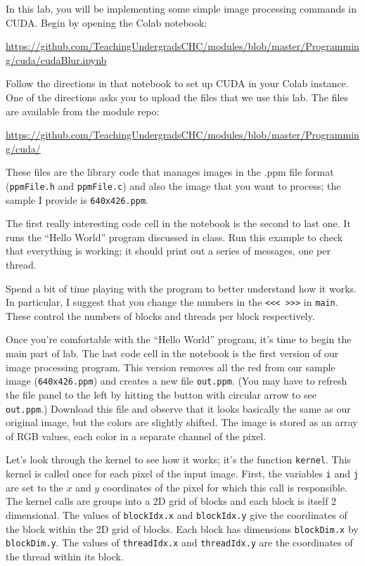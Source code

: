 \documentclass{article}
\begin{document}
In this lab, you will be implementing some simple image processing
commands in CUDA.
Begin by opening the Colab notebook:
\begin{center}
\small\url{https://github.com/TeachingUndergradsCHC/modules/blob/master/Programming/cuda/cudaBlur.ipynb}
\end{center}
Follow the directions in that notebook to set up CUDA in your Colab
instance. One of the directions asks you to upload the files that we
use this lab.
The files are available from the module repo:
\begin{center}
  \small\url{https://github.com/TeachingUndergradsCHC/modules/blob/master/Programming/cuda/}
\end{center}
These files are the library code that manages images in the .ppm
file format ({\tt ppmFile.h} and {\tt ppmFile.c}) and also the image
that you want to process; the sample I provide is {\tt 640x426.ppm}.

The first really interesting code cell in the notebook is the second
to last one.
It runs the ``Hello World'' program discussed in class.
Run this example to check that everything is working; it should print
out a series of messages, one per thread. 

Spend a bit of time playing with the program to better understand how
it works.
In particular, I suggest that you change the numbers in the
{\tt <<< >>>} in {\tt main}.
These control the numbers of blocks and threads per block respectively.

Once you’re comfortable with the ``Hello World'' program, it’s
time to begin the main part of lab.
The last code cell in the notebook
is the first version of our image processing program.
This version removes all the red from our sample image ({\tt 640x426.ppm})
and creates a new file {\tt out.ppm}.
(You may have to refresh the file panel to the left
by hitting the button with circular arrow to see {\tt out.ppm}.)
Download this file and observe that it looks basically the same as our
original image, but the colors are slightly shifted.
The image is stored as an array of RGB values, each color in a
separate channel of the pixel. 

Let's look through the kernel to see how it works; it's the function
{\tt kernel}.
This kernel is called once for each pixel of the input image.
First, the variables {\tt i} and {\tt j} are set to the $x$ and $y$
coordinates of the pixel for which this call is
responsible.
The kernel calls are groups into a 2D grid of blocks and each block
is itself 2 dimensional.
The values of {\tt blockIdx.x} and {\tt blockIdx.y} give the
coordinates of the block within the 2D grid of blocks.
Each block has dimensions {\tt blockDim.x} by {\tt blockDim.y}.
The values of {\tt threadIdx.x} and {\tt threadIdx.y} are the
coordinates of the thread within its block. 
\end{document}
